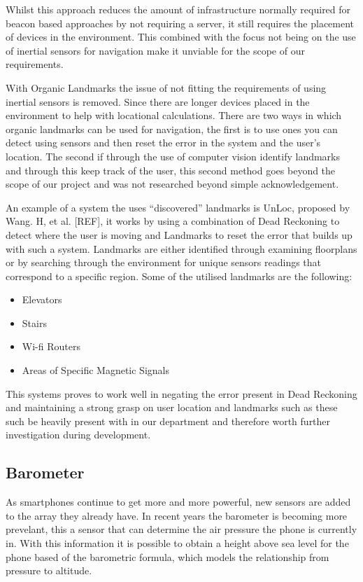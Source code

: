 \documentclass[main.tex]{subfiles}
\begin{document}
Whilst this approach reduces the amount of infrastructure normally required for beacon based approaches by not requiring a server, it still requires the placement of devices in the environment. This combined with the focus not being on the use of inertial sensors for navigation make it unviable for the scope of our requirements.

With Organic Landmarks the issue of not fitting the requirements of using inertial sensors is removed. Since there are longer devices placed in the environment to help with locational calculations. There are two ways in which organic landmarks can be used for navigation, the first is to use ones you can detect using sensors and then reset the error in the system and the user's location. The second if through the use of computer vision identify landmarks and through this keep track of the user, this second method goes beyond the scope of our project and was not researched beyond simple acknowledgement.

An example of a system the uses ``discovered'' landmarks is UnLoc, proposed by Wang. H, et al. [REF], it works by using a combination of Dead Reckoning to detect where the user is moving and Landmarks to reset the error that builds up with such a system. Landmarks are either identified through examining floorplans or by searching through the environment for unique sensors readings that correspond to a specific region. Some of the utilised landmarks are the following:

\begin{itemize}
	\item Elevators
	\item Stairs
	\item Wi-fi Routers
	\item Areas of Specific Magnetic Signals
\end{itemize}

This systems proves to work well in negating the error present in Dead Reckoning and maintaining a strong grasp on user location and landmarks such as these such be heavily present with in our department and therefore worth further investigation during development.

\subsection{Barometer}

As smartphones continue to get more and more powerful, new sensors are added to the array they already have. In recent years the barometer is becoming more prevelant, this a sensor that can determine the air pressure the phone is currently in. With this information it is possible to obtain a height above sea level for the phone based of the barometric formula, which models the relationship from pressure to altitude.
\end{document}

